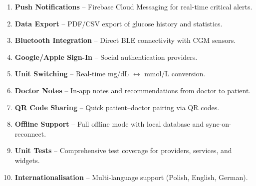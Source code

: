\documentclass[12pt,a4paper]{article}
\begin{document}
\begin{enumerate}
    \item \textbf{Push Notifications} -- Firebase Cloud Messaging for real-time critical alerts.
    \item \textbf{Data Export} -- PDF/CSV export of glucose history and statistics.
    \item \textbf{Bluetooth Integration} -- Direct BLE connectivity with CGM sensors.
    \item \textbf{Google/Apple Sign-In} -- Social authentication providers.
    \item \textbf{Unit Switching} -- Real-time mg/dL $\leftrightarrow$ mmol/L conversion.
    \item \textbf{Doctor Notes} -- In-app notes and recommendations from doctor to patient.
    \item \textbf{QR Code Sharing} -- Quick patient--doctor pairing via QR codes.
    \item \textbf{Offline Support} -- Full offline mode with local database and sync-on-reconnect.
    \item \textbf{Unit Tests} -- Comprehensive test coverage for providers, services, and widgets.
    \item \textbf{Internationalisation} -- Multi-language support (Polish, English, German).
\end{enumerate}

\end{document}

